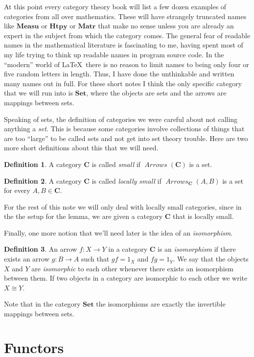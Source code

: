 \documentclass[12pt]{article}
\theoremstyle{definition}
\theoremstyle{definition}
\newtheorem{defn}{Definition}[]
\theoremstyle{definition}
\numberwithin{equation}{section}
\newcommand{\cat}[1]{\mathbf{#1}}      %
\newcommand{\CC}{\cat{C}}
\DeclareMathOperator{\Arrows}{\mathit{Arrows}}
\newcommand{\iso}{\cong}                %
\def\ni{\goodbreak\noindent}
\begin{document}
\goodbreak
At this point every category theory book will list a few dozen examples of categories from
all over mathematics. 
These will have strangely truncated names like
$\cat{Measu}$ or $\cat{Htpy}$ or $\cat{Matr}$ that make no sense unless you are
already an expert in the subject from which the category comes.
{The general fear of readable names in the mathematical literature is fascinating
to me, having spent most of my life trying to think up readable names in program source
code. In the ``modern'' world of \LaTeX\ there is no reason to limit names to being only four
or five random letters in length. Thus, I have done the unthinkable and written many names
out in full.}
For these short notes I think the only specific
category that we will run into is $\cat{Set}$, where the objects are sets and the arrows
are mappings between sets.

Speaking of sets, the definition of categories we were careful about not calling anything
a {\it set}. This is because some categories involve collections of things that are too
``large'' to be called sets and not get into set theory trouble. Here are two more short
definitions about this that we will need.

\begin{defn}
A category $\CC$ is called {\it small} if $\Arrows(\CC)$ is a set.
\end{defn}

\begin{defn}
A category $\CC$ is called {\it locally small} if $\Arrows_{\CC}(A,B)$ is a set for every
$A, B \in \CC$. \end{defn}%
\ni
For the rest of this note we will only deal with locally small categories, since in the
the setup for the lemma, we are given a category $\CC$ that is locally small.

Finally, one more notion that we'll need later is the idea of an {\it isomorphism}.

\begin{defn}
An arrow $f: X \to Y$ in a category $\CC$ is an {\it isomorphism} if there exists an arrow
$g: B \to A$ such that $gf = 1_X$ and $fg = 1_Y$. We say that the objects $X$ and $Y$ are
{\it isomorphic} to each other whenever there exists an isomorphism between them. If two
objects in a category are isomorphic to each other we write $X \iso Y$.
\end{defn}
\ni
Note that in the category $\cat{Set}$ the isomorphisms are exactly the invertible mappings
between sets.

\section{Functors}
\end{document}
